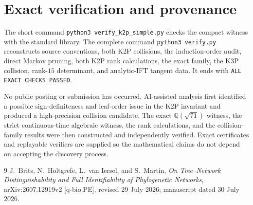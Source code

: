 \documentclass[11pt]{article}
\theoremstyle{remark}\newtheorem{remark}[theorem]{Remark}
\begin{document}
\section{Exact verification and provenance}
The short command \texttt{python3 verify\_k2p\_simple.py} checks the compact witness with the standard library. The complete command \texttt{python3 verify.py} reconstructs source conventions, both K2P collisions, the induction-order audit, direct Markov pruning, both K2P rank calculations, the exact family, the K3P collision, rank-$15$ determinant, and analytic-IFT tangent data. It ends with \texttt{ALL EXACT CHECKS PASSED}.

No public posting or submission has occurred. AI-assisted analysis first identified a possible sign-definiteness and leaf-order issue in the K2P invariant and produced a high-precision collision candidate. The exact $\mathbb Q(\sqrt{71})$ witness, the strict continuous-time algebraic witness, the rank calculations, and the collision-family results were then constructed and independently verified. Exact certificates and replayable verifiers are supplied so the mathematical claims do not depend on accepting the discovery process.

\begin{thebibliography}{9}
J.~Brits, N.~Holtgrefe, L.~van Iersel, and S.~Martin, \emph{On Tree--Network Distinguishability and Full Identifiability of Phylogenetic Networks}, arXiv:2607.12919v2 [q-bio.PE], revised 29 July 2026; manuscript dated 30 July 2026.
\end{thebibliography}
\end{document}
